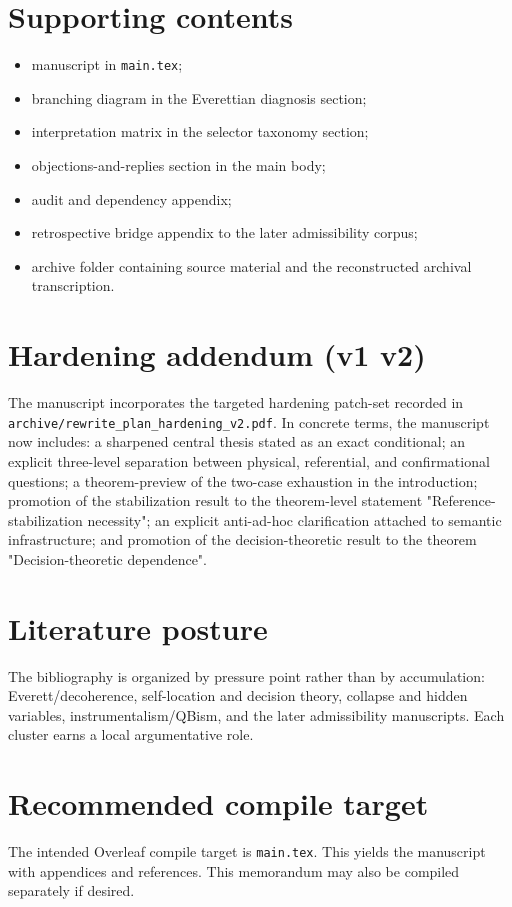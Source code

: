 \documentclass[11pt]{article}
\begin{document}
\section*{Supporting contents}
\begin{itemize}
\item manuscript in \texttt{main.tex};
\item branching diagram in the Everettian diagnosis section;
\item interpretation matrix in the selector taxonomy section;
\item objections-and-replies section in the main body;
\item audit and dependency appendix;
\item retrospective bridge appendix to the later admissibility corpus;
\item archive folder containing source material and the reconstructed archival transcription.
\end{itemize}

\section*{Hardening addendum (v1 \textrightarrow{} v2)}
The manuscript incorporates the targeted hardening patch-set recorded in \texttt{archive/rewrite\_plan\_hardening\_v2.pdf}. In concrete terms, the manuscript now includes: a sharpened central thesis stated as an exact conditional; an explicit three-level separation between physical, referential, and confirmational questions; a theorem-preview of the two-case exhaustion in the introduction; promotion of the stabilization result to the theorem-level statement "Reference-stabilization necessity"; an explicit anti-ad-hoc clarification attached to semantic infrastructure; and promotion of the decision-theoretic result to the theorem "Decision-theoretic dependence".

\section*{Literature posture}
The bibliography is organized by pressure point rather than by accumulation: Everett/decoherence, self-location and decision theory, collapse and hidden variables, instrumentalism/QBism, and the later admissibility manuscripts. Each cluster earns a local argumentative role.

\section*{Recommended compile target}
The intended Overleaf compile target is \texttt{main.tex}. This yields the manuscript with appendices and references. This memorandum may also be compiled separately if desired.
\end{document}
